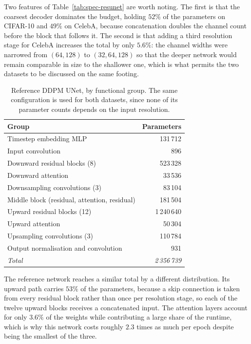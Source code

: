 Two features of Table~\ref{tab:spec-resunet} are worth noting. The first is that the coarsest
decoder dominates the budget, holding $52\%$ of the parameters on CIFAR-10 and $49\%$ on CelebA,
because concatenation doubles the channel count before the block that follows it. The second is that
adding a third resolution stage for CelebA increases the total by only $5.6\%$: the channel widths
were narrowed from $(64, 128)$ to $(32, 64, 128)$ so that the deeper network would remain comparable
in size to the shallower one, which is what permits the two datasets to be discussed on the same
footing.

\begin{table}[htbp]
    \centering
    \caption{Reference DDPM UNet, by functional group. The same configuration is used for both
    datasets, since none of its parameter counts depends on the input resolution.}
    \label{tab:spec-ddpm}
    \small
    \begin{tabular}{lr}
        \toprule
        Group & Parameters \\
        \midrule
        Timestep embedding MLP & 131\,712 \\
        Input convolution & 896 \\
        Downward residual blocks (8) & 523\,328 \\
        Downward attention & 33\,536 \\
        Downsampling convolutions (3) & 83\,104 \\
        Middle block (residual, attention, residual) & 181\,504 \\
        Upward residual blocks (12) & 1\,240\,640 \\
        Upward attention & 50\,304 \\
        Upsampling convolutions (3) & 110\,784 \\
        Output normalisation and convolution & 931 \\
        \midrule
        \emph{Total} & \emph{2\,356\,739} \\
        \bottomrule
    \end{tabular}
\end{table}

The reference network reaches a similar total by a different distribution. Its upward path carries
$53\%$ of the parameters, because a skip connection is taken from every residual block rather than
once per resolution stage, so each of the twelve upward blocks receives a concatenated input. The
attention layers account for only $3.6\%$ of the weights while contributing a large share of the
runtime, which is why this network costs roughly $2.3$ times as much per epoch despite being the
smallest of the three.


